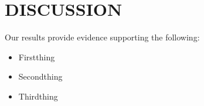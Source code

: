 \section{DISCUSSION}

Our results provide evidence supporting the following:
\begin{itemize}
	\item{Firstthing}
	\item{Secondthing}
	\item{Thirdthing}
\end{itemize}